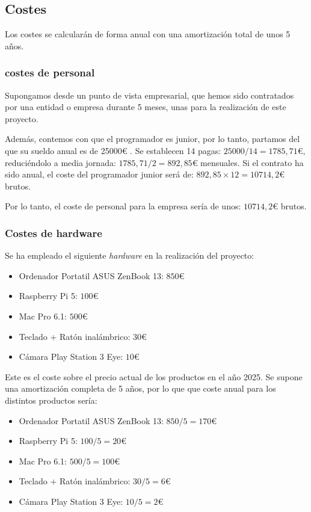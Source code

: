 \subsection{Costes}
Los costes se calcularán de forma anual con una amortización total de unos 5 años.

\subsubsection{costes de personal}
Supongamos desde un punto de vista empresarial, que hemos sido contratados por una entidad o empresa durante 5 meses, unas para la realización de este proyecto.

Además, contemos con que el programador es junior, por lo tanto, partamos del que su sueldo anual es de 25000€ \cite{web:salario_junior}.
Se establecen 14 pagas: $25000 / 14 = 1785,71$€, reduciéndolo a media jornada: $1785,71/2 = 892,85$€ mensuales. Si el contrato ha sido anual, el coste del programador junior será de: $892,85 \times 12 = 10714,2$€ brutos. 

Por lo tanto, el coste de personal para la empresa sería de unos: $10714,2$€ brutos.

\subsubsection{Costes de hardware}
Se ha empleado el siguiente \textit{hardware} en la realización del proyecto:
\begin{itemize}
    \item Ordenador Portatil ASUS ZenBook 13: $850$€
    \item Raspberry Pi 5: $100$€
    \item Mac Pro 6.1: $500$€
    \item Teclado + Ratón inalámbrico: $30$€
    \item Cámara Play Station 3 Eye: $10$€
\end{itemize}

Este es el coste sobre el precio actual de los productos en el año 2025. Se supone una amortización completa de 5 años, por lo que que coste anual para los distintos productos sería: 

\begin{itemize}
    \item Ordenador Portatil ASUS ZenBook 13: $850 / 5 = 170$€
    \item Raspberry Pi 5: $100 / 5 = 20$€
    \item Mac Pro 6.1: $500 / 5 = 100$€
    \item Teclado + Ratón inalámbrico: $30 / 5 = 6$€
    \item Cámara Play Station 3 Eye: $10 / 5 = 2$€
\end{itemize}

